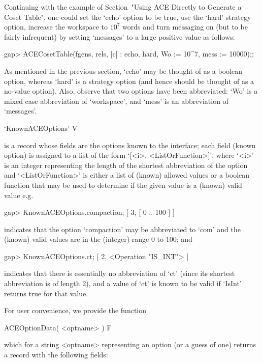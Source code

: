 
Continuing with the example of Section~"Using ACE Directly to Generate
a Coset Table", one could set the `echo' option to be  true,  use  the
`hard' strategy option, increase the workspace  to  $10^7$  words  and
turn messaging on (but to be fairly infrequent) by setting  `messages'
to a large positive value as follows:

\beginexample
gap> ACECosetTable(fgens, rels, [c] : echo, hard, Wo := 10^7, mess := 10000);;
\endexample

As mentioned in the previous section, `echo' may be thought  of  as  a
boolean option, whereas `hard' is a strategy option (and hence  should
be thought of as a no-value option). Also, observe  that  two  options
have  been  abbreviated:  `Wo'  is  a  mixed  case   abbreviation   of
`workspace', and `mess' is an abbreviation of `messages'.


\>`KnownACEOptions' V

is a {\GAP} record whose fields are the {\ACE} options  known  to  the
{\ACE} interface; each field (known {\ACE} option) is  assigned  to  a
list of the form `[<i>, <ListOrFunction>]', where `<i>' is an  integer
representing the length of the shortest abbreviation of the option and
`<ListOrFunction>' is either a list of (known)  allowed  values  or  a
boolean function that may be used to determine if the given value is a
(known) valid value e.g.

\beginexample
gap> KnownACEOptions.compaction;
[ 3, [ 0 .. 100 ] ]
\endexample

indicates that the option `compaction' may be  abbreviated  to  `com'
and the (known) valid values are in the (integer) range 0 to 100; and

\beginexample
gap> KnownACEOptions.ct;
[ 2, <Operation "IS_INT"> ]
\endexample

indicates that there is essentially no abbreviation of `ct' (since its
shortest abbreviation is of length 2),  and a value of  `ct' is  known
to be valid if `IsInt' returns true for that value.

For user convenience, we provide the function

\>ACEOptionData( <optname> ) F

which for a string <optname> representing an {\ACE} option (or a guess
of one) returns a record with the following fields:

